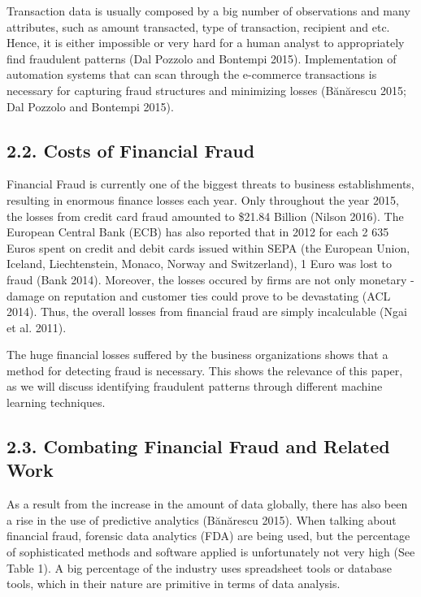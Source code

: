 \documentclass[12pt,]{article}
\begin{document}
Transaction data is usually composed by a big number of observations and
many attributes, such as amount transacted, type of transaction,
recipient and etc. Hence, it is either impossible or very hard for a
human analyst to appropriately find fraudulent patterns (Dal Pozzolo and
Bontempi 2015). Implementation of automation systems that can scan
through the e-commerce transactions is necessary for capturing fraud
structures and minimizing losses (Bănărescu 2015; Dal Pozzolo and
Bontempi 2015).

\hypertarget{costs-of-financial-fraud}{%
\subsection{2.2. Costs of Financial
Fraud}\label{costs-of-financial-fraud}}

Financial Fraud is currently one of the biggest threats to business
establishments, resulting in enormous finance losses each year. Only
throughout the year 2015, the losses from credit card fraud amounted to
\$21.84 Billion (Nilson 2016). The European Central Bank (ECB) has also
reported that in 2012 for each 2 635 Euros spent on credit and debit
cards issued within SEPA (the European Union, Iceland, Liechtenstein,
Monaco, Norway and Switzerland), 1 Euro was lost to fraud (Bank 2014).
Moreover, the losses occured by firms are not only monetary - damage on
reputation and customer ties could prove to be devastating (ACL 2014).
Thus, the overall losses from financial fraud are simply incalculable
(Ngai et al. 2011).

The huge financial losses suffered by the business organizations shows
that a method for detecting fraud is necessary. This shows the relevance
of this paper, as we will discuss identifying fraudulent patterns
through different machine learning techniques.

\hypertarget{combating-financial-fraud-and-related-work}{%
\subsection{2.3. Combating Financial Fraud and Related
Work}\label{combating-financial-fraud-and-related-work}}

As a result from the increase in the amount of data globally, there has
also been a rise in the use of predictive analytics (Bănărescu 2015).
When talking about financial fraud, forensic data analytics (FDA) are
being used, but the percentage of sophisticated methods and software
applied is unfortunately not very high (See Table 1). A big percentage
of the industry uses spreadsheet tools or database tools, which in their
nature are primitive in terms of data analysis.
\end{document}
